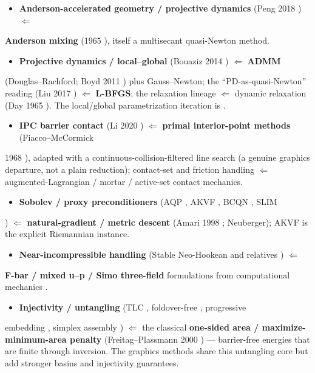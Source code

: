 \documentclass{egpubl}
\begin{document}
\begin{itemize}
  \item \textbf{Anderson-accelerated geometry / projective dynamics} (Peng 2018 \cite{anderson-geometry}) $\Leftarrow$
\end{itemize}
  \textbf{Anderson mixing} (1965 \cite{anderson-1965}), itself a multisecant quasi-Newton method.

\begin{itemize}
  \item \textbf{Projective dynamics / local--global} (Bouaziz 2014 \cite{projective-dynamics}) $\Leftarrow$ \textbf{ADMM}
\end{itemize}
  (Douglas--Rachford; Boyd 2011 \cite{boyd-2011-admm}) plus Gauss--Newton; the ``PD-as-quasi-Newton''
  reading (Liu 2017 \cite{quasi-newton-liu2017}) $\Leftarrow$ \textbf{L-BFGS}; the relaxation lineage $\Leftarrow$ dynamic
  relaxation (Day 1965 \cite{day-1965}). The local/global parametrization iteration is
  \cite{local-global}.

\begin{itemize}
  \item \textbf{IPC barrier contact} (Li 2020 \cite{ipc}) $\Leftarrow$ \textbf{primal interior-point methods} (Fiacco--McCormick
\end{itemize}
  1968 \cite{fiacco-mccormick-1968}), adapted with a continuous-collision-filtered line search (a
  genuine graphics departure, not a plain reduction); contact-set and friction handling $\Leftarrow$
  augmented-Lagrangian / mortar / active-set contact mechanics.

\begin{itemize}
  \item \textbf{Sobolev / proxy preconditioners} (AQP \cite{aqp}, AKVF \cite{akvf}, BCQN \cite{bcqn}, SLIM
\end{itemize}
  \cite{slim}) $\Leftarrow$ \textbf{natural-gradient / metric descent} (Amari 1998 \cite{amari-1998}; Neuberger); AKVF
  is the explicit Riemannian instance.

\begin{itemize}
  \item \textbf{Near-incompressible handling} (Stable Neo-Hookean and relatives \cite{stable-neo-hookean}) $\Leftarrow$
\end{itemize}
  \textbf{F-bar / mixed u--p / Simo three-field} formulations from computational mechanics
  \cite{simo-1985-fbar}.

\begin{itemize}
  \item \textbf{Injectivity / untangling} (TLC \cite{tlc}, foldover-free \cite{foldover-free}, progressive
\end{itemize}
  embedding \cite{progressive-embedding}, simplex assembly \cite{simplex-assembly}) $\Leftarrow$ the classical
  \textbf{one-sided area / maximize-minimum-area penalty} (Freitag--Plassmann 2000 \cite{freitag-plassmann-2000})
  --- barrier-free energies that are finite through inversion. The graphics methods share this untangling
  core but add stronger basins and injectivity guarantees.
\end{document}

